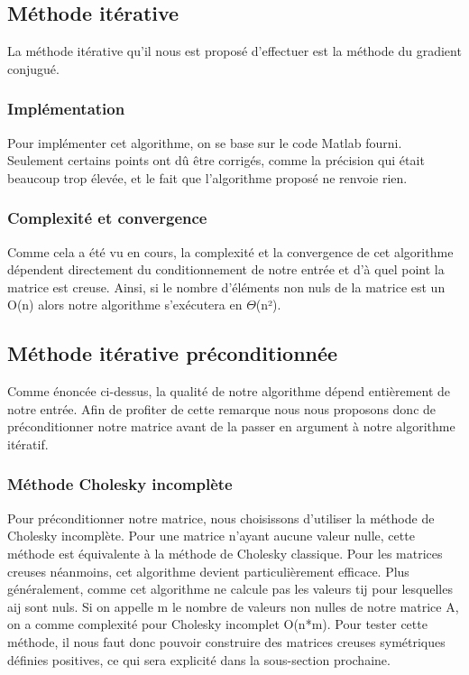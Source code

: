 \documentclass{article}
\begin{document}
\subsection*{Méthode itérative}
La méthode itérative qu'il nous est proposé d'effectuer est la méthode du gradient conjugué. 
\subsubsection*{Implémentation}
Pour implémenter cet algorithme, on se base sur le code Matlab fourni. Seulement certains points ont dû être corrigés, comme la précision qui était beaucoup trop élevée, et le fait que l'algorithme proposé ne renvoie rien. 
\subsubsection*{Complexité et convergence}
Comme cela a été vu en cours, la complexité et la convergence de cet algorithme dépendent directement du conditionnement de notre entrée et d'à quel point la matrice est creuse.
Ainsi, si le nombre d'éléments non nuls de la matrice est un O(n) alors notre algorithme s'exécutera en \( \Theta \)(n²).
\subsection*{Méthode itérative préconditionnée}
Comme énoncée ci-dessus, la qualité de notre algorithme dépend entièrement de notre entrée. Afin de profiter de cette remarque nous nous proposons donc de préconditionner notre matrice avant de la passer en argument à notre algorithme itératif.
\subsubsection*{Méthode Cholesky incomplète}
Pour préconditionner notre matrice, nous choisissons d'utiliser la méthode de Cholesky incomplète.
Pour une matrice n'ayant aucune valeur nulle, cette méthode est équivalente à la méthode de Cholesky classique. Pour les matrices creuses néanmoins, cet algorithme devient particulièrement efficace. Plus généralement, comme cet algorithme ne calcule pas les valeurs tij pour lesquelles aij sont nuls. Si on appelle m le nombre de valeurs non nulles de notre matrice A, on a comme complexité pour Cholesky incomplet O(n*m).
Pour tester cette méthode, il nous faut donc pouvoir construire des matrices creuses symétriques définies positives, ce qui sera explicité dans la sous-section prochaine.
\end{document}
